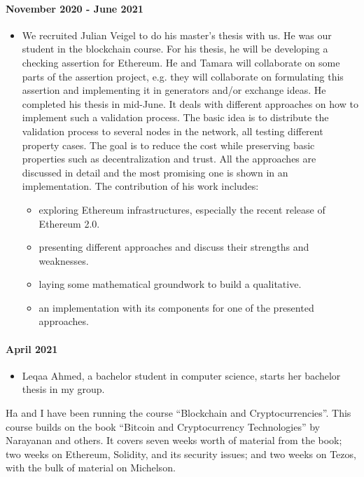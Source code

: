 \documentclass[a4paper,11pt]{article}
\begin{document}
\paragraph{November 2020 - June 2021}
\begin{itemize}
\item We recruited Julian Veigel to do his master's thesis with us. He was our student in the blockchain course. For his thesis, he will be developing a checking assertion for Ethereum. He and Tamara will collaborate on some parts of the assertion project, e.g. they will collaborate on formulating this assertion and implementing it in generators and/or exchange ideas. He completed his thesis in mid-June. It deals with different approaches on how to implement such a validation process. The basic idea is to distribute the validation process to several nodes in the network, all testing different property cases. The goal is to reduce the cost while preserving basic properties such as decentralization and trust. All the approaches are discussed in detail and the most promising one is shown in an implementation. The contribution of his work includes:
\begin{itemize}
\item exploring Ethereum infrastructures, especially the recent release of Ethereum 2.0.
\item presenting different approaches and discuss their strengths and weaknesses.
\item laying some mathematical groundwork to build a qualitative.
\item an implementation with its components for one of the presented approaches.
\end{itemize}
\end{itemize}


\paragraph{April 2021}
\begin{itemize}
\item Leqaa Ahmed, a bachelor student in computer science, starts her bachelor thesis in my group. 
\end{itemize}

Ha and I have been running the course “Blockchain and Cryptocurrencies”. This course builds on the book “Bitcoin and Cryptocurrency Technologies” by Narayanan and others. It covers seven weeks worth of material from the book; two weeks on Ethereum, Solidity, and its security issues; and two weeks on Tezos, with the bulk of material on Michelson.
\end{document}
